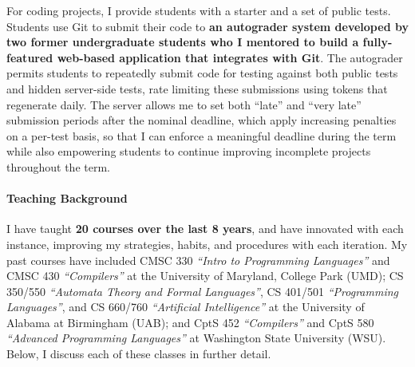 \documentclass[12pt]{article}
\begin{document}
For coding projects, I provide students with a starter and a set of public tests. Students use Git to submit their code to \textbf{an autograder system developed by two former undergraduate students who I mentored to build a fully-featured web-based application that integrates with Git}. The autograder permits students to repeatedly submit code for testing against both public tests and hidden server-side tests, rate limiting these submissions using tokens that regenerate daily. The server allows me to set both ``late'' and ``very late'' submission periods after the nominal deadline, which apply increasing penalties on a per-test basis, so that I can enforce a meaningful deadline during the term while also empowering students to continue improving incomplete projects throughout the term.



\paragraph{Teaching Background}

I have taught \textbf{20 courses over the last 8 years}, and have innovated with each instance, improving my strategies, habits, and procedures with each iteration. My past courses have included CMSC 330 \emph{``Intro to Programming Languages''} and CMSC 430 \emph{``Compilers''} at the University of Maryland, College Park (UMD); CS 350/550 \emph{``Automata Theory and Formal Languages''}, CS 401/501 \emph{``Programming Languages''}, and CS 660/760 \emph{``Artificial Intelligence''} at the University of Alabama at Birmingham (UAB); and CptS 452 \emph{``Compilers''} and CptS 580 \emph{``Advanced Programming Languages''} at Washington State University (WSU). Below, I discuss each of these classes in further detail.
 
\end{document}
